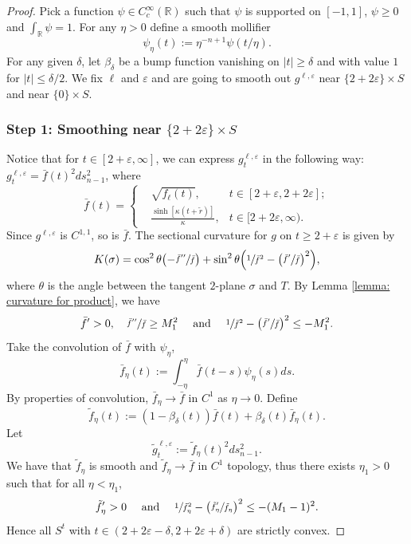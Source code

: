 \documentclass[10pt]{amsart}
\theoremstyle{definition}
\let\eps\varepsilon
\renewcommand{\>}{{\rangle}}
\newcommand{\<}{{\langle}}
\begin{document}
\begin{proof}
Pick a function $\psi\in C^{\infty}_c(\mathbb{R})$ such that $\psi$ is supported on $[-1,1]$, $\psi\geq 0$ and $\int_{\mathbb{R}}\psi=1$. For any $\eta>0$ define a smooth mollifier
\[
\psi_\eta(t):=\eta^{-n+1}\psi(t/\eta).
\]
For any given $\delta$, let $\beta_\delta$ be a bump function vanishing on $|t|\geq \delta$ and with value $1$ for $|t|\leq \delta/2$. We fix $\ell$ and $\eps$ and are going to smooth out $g^{\ell,\eps}$ near $\{2+2\eps\}\times S$ and near $\{0\}\times S$.

\subsubsection*{Step 1: Smoothing near $\{2+2\eps\}\times S$}
Notice that for $t\in [2+\eps, \infty]$, we can express $g^{\ell,\eps}_t$ in the following way: $g^{\ell,\eps}_t=\bar{f}(t)^2ds^2_{n-1}$, where
\begin{equation*}
\bar{f}(t)=\left\{\begin{aligned}
&\sqrt{f_\ell(t)}, &t\in [2+\eps, 2+2\eps];\\
&\frac{\sinh [\kappa(t+\tilde{r})]}{\kappa}, &t\in [2+2\eps,\infty).
\end{aligned}
\right.
\end{equation*}
Since $g^{\ell,\eps}$ is $C^{1,1}$, so is $\bar{f}$. The sectional curvature for $g$ on $t\geq 2+\eps$ is given by
\[
K(\sigma)=\cos^2\theta\bigl(-\sfrac{\bar{f}''}{\bar{f}}\bigr)+\sin^2\theta\Bigl(\sfrac{1}{\bar{f}^2}-\bigl(\sfrac{\bar{f}'}{\bar{f}}\bigr)^2\Bigr),
\]
where $\theta$ is the angle between the tangent $2$-plane $\sigma$ and $T$.
By Lemma \ref{lemma: curvature for product}, we have
\[
\bar{f}'>0, \quad \sfrac{\bar{f}''}{\bar{f}}\geq M_1^2\quad \text{ and } \quad \sfrac{1}{\bar{f}^2}-\bigl(\sfrac{\bar{f}'}{\bar{f}} \bigr)^2\leq -M_1^2.
\]
Take the convolution of $\bar{f}$ with $\psi_{\eta}$,
\[
\bar{f}_{\eta}(t):=\int_{-\eta}^{\eta}\bar{f}(t-s)\psi_{\eta}(s)ds.
\]
By properties of convolution, $\bar{f}_{\eta}\to\bar{f}$ in $C^1$ as $\eta\to 0$. Define
\[
\tilde{f}_{\eta}(t):=(1-\beta_\delta(t))\bar{f}(t)+\beta_\delta(t)\bar{f}_{\eta}(t).
\]
Let
\[
\tilde{g}^{\ell,\eps}_t:=\tilde{f}_{\eta}(t)^2ds^2_{n-1}.
\]
We have that $\tilde{f}_{\eta}$ is smooth and $\tilde{f}_{\eta}\to\bar{f}$ in $C^1$ topology, thus there exists $\eta_1>0$ such that for all $\eta<\eta_1$,
\[
\tilde{f}'_{\eta}>0\quad \text{ and } \quad \sfrac{1}{\tilde{f}_{\eta}^2}-\bigl(\sfrac{\tilde{f}'_{\eta}}{\tilde{f}_{\eta}} \bigr)^2\leq -(M_1-1)^2.
\]
Hence all $S^t$ with $t\in (2+2\eps-\delta,2+2\eps+\delta)$ are strictly convex.


\end{proof}
\end{document}
